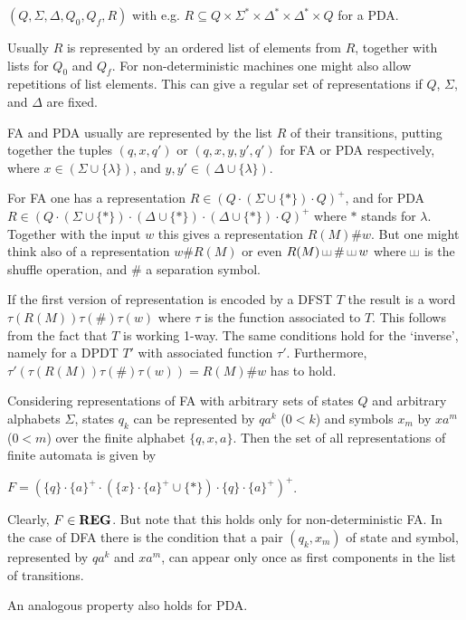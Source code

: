 \documentclass{eptcs}
\def\shuf{\mathbin{\mathchoice
{\rule{.3pt}{1ex}\rule{.3em}{.3pt}\rule{.3pt}{1ex}
\rule{.3em}{.3pt}\rule{.3pt}{1ex}}{\rule{.3pt}{1ex}\rule{.3em}{.3pt}\rule{.3pt}{1ex}
\rule{.3em}{.3pt}\rule{.3pt}{1ex}}{\rule{.2pt}{.7ex}\rule{.2em}{.2pt}\rule{.2pt}{.7ex}
\rule{.2em}{.2pt}\rule{.2pt}{.7ex}}{\rule{.3pt}{1ex}\rule{.3em}{.3pt}\rule{.3pt}{1ex}
\rule{.3em}{.3pt}\rule{.3pt}{1ex}}}}
\begin{document}
$(Q,\Sigma,\Delta,Q_0,Q_f,R)$ with e.g. 
$R\subseteq Q\times\Sigma^*\times\Delta^*\times\Delta^*\times Q$ for a PDA.

\noindent
Usually $R$ is represented by an ordered list of elements from $R$, together with
lists for $Q_0$ and $Q_f$. For non-deterministic machines one might also allow
repetitions of list elements. This can give a regular set of representations if
$Q$, $\Sigma$, and $\Delta$ are fixed.

FA and PDA usually are represented by the list $R$ of their transitions,
putting together the tuples $(q,x,q')$ or $(q,x,y,y',q')$ for FA or PDA
respectively, where $x\in(\Sigma\cup\{\lambda\})$, and
$y,y'\in(\Delta\cup\{\lambda\})$.

For FA one has a representation $R\in(Q\cdot (\Sigma\cup\{*\})\cdot Q)^+$, and for PDA
$R\in(Q\cdot (\Sigma\cup\{*\})\cdot (\Delta\cup\{*\})\cdot
 (\Delta\cup\{*\})\cdot Q)^+$
where $*$ stands for $\lambda$.
Together with the input $w$ this gives a representation $R(M){\#}w$.
But one might think also of a representation $w{\#}R(M)$ or even
$R(M)\shuf {\#}\shuf w$ where $\shuf$ is the shuffle operation,
and ${\#}$ a separation symbol.

If the first version of representation is encoded by a DFST $T$ the result is a word
$\tau(R(M))\tau({\#})\tau(w)$ where $\tau$ is the function associated to $T$. 
This follows from the fact that $T$ is working 1-way.
The same conditions hold for the `inverse', namely for a DPDT $T'$ with
associated function $\tau'$. Furthermore,
$\tau'(\tau(R(M))\tau({\#})\tau(w)) = R(M){\#}w$ has to hold.

\medskip

Considering representations of FA with arbitrary sets of states $Q$ and arbitrary
alphabets $\Sigma$, states $q_k$ can be represented by $qa^k$ ($0<k$) and symbols $x_m$ by
$xa^m$ ($0<m$) over the finite alphabet $\{q,x,a\}$. Then the set of all
representations of finite automata is given by

$F=(\{q\}\cdot \{a\}^+\cdot (\{x\}\cdot\{a\}^+\cup\{*\})\cdot \{q\}\cdot\{a\}^+)^+$.

Clearly, $F\in {\bf REG}$. But note that this holds only for non-deterministic FA.
In the case of DFA there is the condition that a pair $(q_k,x_m)$
of state and symbol, represented by $qa^k$ and $xa^m$,
can appear only once as first components in the list of transitions. 

An analogous property also holds for PDA.

\medskip
\end{document}
